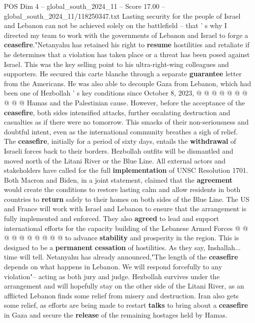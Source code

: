\begin{textsample}{POS Dim 4 – global\_south\_2024\_11 – Score 17.00 – global\_south\_2024\_11/118250347.txt}
Lasting security for the people of Israel and Lebanon can not be achieved solely on the battlefield -- that ' s why I directed my team to work with the governments of Lebanon and Israel to forge a \textbf{ceasefire}."Netanyahu has retained his right to \textbf{resume} hostilities and retaliate if he determines that a violation has taken place or a threat has been posed against Israel.
This was the key selling point to his ultra-right-wing colleagues and supporters.
He secured this carte blanche through a separate \textbf{guarantee} letter from the Americans.
He was also able to decouple Gaza from Lebanon, which had been one of Hezbollah ' s key conditions since October 8, 2023, @ @ @ @ @ @ @ @ @ @ Hamas and the Palestinian cause.
However, before the acceptance of the \textbf{ceasefire}, both sides intensified attacks, further escalating destruction and casualties as if there were no tomorrow.
This smacks of their non-seriousness and doubtful intent, even as the international community breathes a sigh of relief.
The \textbf{ceasefire}, initially for a period of sixty days, entails the \textbf{withdrawal} of Israeli forces back to their borders.
Hezbollah outfits will be dismantled and moved north of the Litani River or the Blue Line.
All external actors and stakeholders have called for the full \textbf{implementation} of UNSC Resolution 1701.
Both Macron and Biden, in a joint statement, claimed that the \textbf{agreement} would create the conditions to restore lasting calm and allow residents in both countries to \textbf{return} safely to their homes on both sides of the Blue Line.
The US and France will work with Israel and Lebanon to ensure that the arrangement is fully implemented and enforced.
They also \textbf{agreed} to lead and support international efforts for the capacity building of the Lebanese Armed Forces @ @ @ @ @ @ @ @ @ @ to advance \textbf{stability} and prosperity in the region.
This is designed to be a \textbf{permanent} \textbf{cessation} of hostilities.
As they say, Inshallah... time will tell.
Netanyahu has already announced,"The length of the \textbf{ceasefire} depends on what happens in Lebanon.
We will respond forcefully to any violation"-- acting as both jury and judge.
Hezbollah survives under the arrangement and will hopefully stay on the other side of the Litani River, as an afflicted Lebanon finds some relief from misery and destruction.
Iran also gets some relief, as efforts are being made to restart \textbf{talks} to bring about a \textbf{ceasefire} in Gaza and secure the \textbf{release} of the remaining hostages held by Hamas.

\end{textsample}
